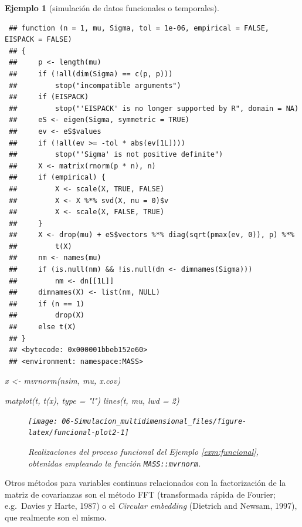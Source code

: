 \documentclass[
]{book}
\newenvironment{Shaded}{\begin{snugshade}}{\end{snugshade}}
\newcommand{\AttributeTok}[1]{\textcolor[rgb]{0.77,0.63,0.00}{#1}}
\newcommand{\DecValTok}[1]{\textcolor[rgb]{0.00,0.00,0.81}{#1}}
\newcommand{\FunctionTok}[1]{\textcolor[rgb]{0.00,0.00,0.00}{#1}}
\newcommand{\NormalTok}[1]{#1}
\newcommand{\OtherTok}[1]{\textcolor[rgb]{0.56,0.35,0.01}{#1}}
\newcommand{\StringTok}[1]{\textcolor[rgb]{0.31,0.60,0.02}{#1}}
\theoremstyle{break}
\newtheorem{example}{Ejemplo}[chapter]
\theoremstyle{nonumberplain}
\begin{document}
\begin{example}[simulación de datos funcionales o temporales]
\begin{verbatim}
 ## function (n = 1, mu, Sigma, tol = 1e-06, empirical = FALSE, EISPACK = FALSE) 
 ## {
 ##     p <- length(mu)
 ##     if (!all(dim(Sigma) == c(p, p))) 
 ##         stop("incompatible arguments")
 ##     if (EISPACK) 
 ##         stop("'EISPACK' is no longer supported by R", domain = NA)
 ##     eS <- eigen(Sigma, symmetric = TRUE)
 ##     ev <- eS$values
 ##     if (!all(ev >= -tol * abs(ev[1L]))) 
 ##         stop("'Sigma' is not positive definite")
 ##     X <- matrix(rnorm(p * n), n)
 ##     if (empirical) {
 ##         X <- scale(X, TRUE, FALSE)
 ##         X <- X %*% svd(X, nu = 0)$v
 ##         X <- scale(X, FALSE, TRUE)
 ##     }
 ##     X <- drop(mu) + eS$vectors %*% diag(sqrt(pmax(ev, 0)), p) %*% 
 ##         t(X)
 ##     nm <- names(mu)
 ##     if (is.null(nm) && !is.null(dn <- dimnames(Sigma))) 
 ##         nm <- dn[[1L]]
 ##     dimnames(X) <- list(nm, NULL)
 ##     if (n == 1) 
 ##         drop(X)
 ##     else t(X)
 ## }
 ## <bytecode: 0x000001bbeb152e60>
 ## <environment: namespace:MASS>
\end{verbatim}

\begin{Shaded}
\begin{Highlighting}[]
\NormalTok{x }\OtherTok{\textless{}{-}} \FunctionTok{mvrnorm}\NormalTok{(nsim, mu, x.cov)}

\FunctionTok{matplot}\NormalTok{(t, }\FunctionTok{t}\NormalTok{(x), }\AttributeTok{type =} \StringTok{"l"}\NormalTok{)}
\FunctionTok{lines}\NormalTok{(t, mu, }\AttributeTok{lwd =} \DecValTok{2}\NormalTok{)}
\end{Highlighting}
\end{Shaded}

\begin{figure}[!htb]

{\centering \texttt{[image: 06-Simulacion\_multidimensional\_files/figure-latex/funcional-plot2-1]} 

}

\caption{Realizaciones del proceso funcional del Ejemplo \ref{exm:funcional}, obtenidas empleando la función \texttt{MASS::mvrnorm}.}\label{fig:funcional-plot2}
\end{figure}

\end{example}

Otros métodos para variables continuas relacionados con la factorización de la matriz de covarianzas son el método FFT (transformada rápida de Fourier; e.g.~Davies y Harte, 1987) o el \emph{Circular embedding} (Dietrich and Newsam, 1997), que realmente son el mismo.
\end{document}

